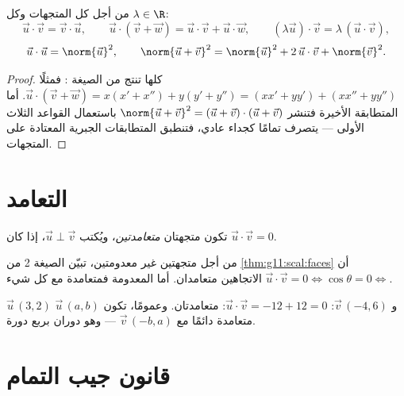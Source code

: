 \begin{proposition}\label{prop:g11:scal:rules}
من أجل كل المتجهات وكل $\lambda \in \R$:
\[
\vec u \cdot \vec v = \vec v \cdot \vec u, \qquad
\vec u \cdot (\vec v + \vec w) = \vec u \cdot \vec v + \vec u \cdot
\vec w, \qquad
(\lambda \vec u)\cdot \vec v = \lambda\,(\vec u \cdot \vec v),
\]
\[
\vec u \cdot \vec u = \norm{\vec u}^2,
\qquad
\norm{\vec u + \vec v}^2 = \norm{\vec u}^2 + 2\,\vec u\cdot\vec v +
\norm{\vec v}^2 .
\]
\end{proposition}

\begin{proof}
كلها تنتج من الصيغة : فمثلًا
$\vec u \cdot (\vec v + \vec w) = x(x' + x'') + y(y' + y'') =
(xx' + yy') + (xx'' + yy'')$. أما المتطابقة الأخيرة فتنشر
$\norm{\vec u + \vec v}^2 = (\vec u + \vec v)\cdot(\vec u + \vec v)$
باستعمال القواعد الثلاث الأولى ---  يتصرف تمامًا
كجداء عادي، فتنطبق المتطابقات الجبرية المعتادة على المتجهات.
\end{proof}

\section{التعامد}

\begin{definition}\label{def:g11:scal:orthogonal}
تكون متجهتان \emph{متعامدتين}، ويُكتب
$\vec u \perp \vec v$، إذا كان $\vec u \cdot \vec v = 0$.
\end{definition}

\begin{remark}
من أجل متجهتين غير معدومتين، تبيّن الصيغة 2 من \cref{thm:g11:scal:faces} أن
$\vec u \cdot \vec v = 0 \iff \cos\theta = 0 \iff$ الاتجاهين
متعامدان. أما  المعدومة فمتعامدة مع كل شيء.
\end{remark}

\begin{example}
$\vec u\,(3, 2)$ و $\vec v\,(-4, 6)$: $\vec u \cdot \vec v = -12 + 12 =
0$: متعامدتان. وعمومًا، تكون $\vec u\,(a, b)$ متعامدة دائمًا مع
$\vec v\,(-b, a)$ --- وهو دوران بربع دورة.
\end{example}

\section{قانون جيب التمام}

